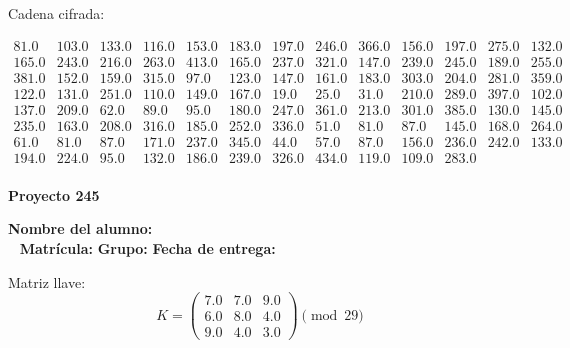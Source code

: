 \documentclass[12pt]{article}
\begin{document}
Cadena cifrada:
\begin{center}
$\begin{array}{lllllllllllll}
81.0 & 103.0 & 133.0 & 116.0 & 153.0 & 183.0 & 197.0 & 246.0 & 366.0 & 156.0 & 197.0 & 275.0 & 132.0\\
165.0 & 243.0 & 216.0 & 263.0 & 413.0 & 165.0 & 237.0 & 321.0 & 147.0 & 239.0 & 245.0 & 189.0 & 255.0\\
381.0 & 152.0 & 159.0 & 315.0 & 97.0 & 123.0 & 147.0 & 161.0 & 183.0 & 303.0 & 204.0 & 281.0 & 359.0\\
122.0 & 131.0 & 251.0 & 110.0 & 149.0 & 167.0 & 19.0 & 25.0 & 31.0 & 210.0 & 289.0 & 397.0 & 102.0\\
137.0 & 209.0 & 62.0 & 89.0 & 95.0 & 180.0 & 247.0 & 361.0 & 213.0 & 301.0 & 385.0 & 130.0 & 145.0\\
235.0 & 163.0 & 208.0 & 316.0 & 185.0 & 252.0 & 336.0 & 51.0 & 81.0 & 87.0 & 145.0 & 168.0 & 264.0\\
61.0 & 81.0 & 87.0 & 171.0 & 237.0 & 345.0 & 44.0 & 57.0 & 87.0 & 156.0 & 236.0 & 242.0 & 133.0\\
194.0 & 224.0 & 95.0 & 132.0 & 186.0 & 239.0 & 326.0 & 434.0 & 119.0 & 109.0 & 283.0\\
\end{array}$
\end{center}

\newpage


\textbf{Proyecto 245}

\textbf{Nombre del alumno:} \underline{\hspace{13cm}}\\\
\vspace{1cm}
\textbf{Matrícula:} \underline{\hspace{4cm}} \hspace{1cm}
\textbf{Grupo:} \underline{\hspace{2cm}}
\textbf{Fecha de entrega:} \underline{\hspace{2cm}}

\medskip

Matriz llave:
\[
K = \begin{pmatrix}
7.0 & 7.0 & 9.0\\
6.0 & 8.0 & 4.0\\
9.0 & 4.0 & 3.0
\end{pmatrix} \pmod{29}
\]
\end{document}
